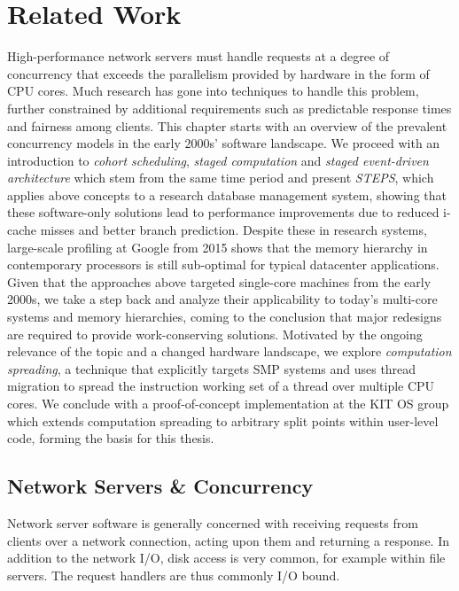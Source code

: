 \documentclass[12pt,a4paper]{book}
\begin{document}
\chapter{Related Work}\label{ch:relwork}
High-performance network servers must handle requests at a degree of concurrency that exceeds the parallelism provided by hardware in the form of CPU cores.
Much research has gone into techniques to handle this problem, further constrained by additional requirements such as predictable response times and fairness among clients.
This chapter starts with an overview of the prevalent concurrency models in the early 2000s' software landscape.
We proceed with an introduction to \emph{cohort scheduling}, \emph{staged computation} and \emph{staged event-driven architecture} which stem from the same time period
and present \emph{STEPS}, which applies above concepts to a research database management system, showing that these software-only solutions lead to performance improvements due to reduced i-cache misses and better branch prediction.
Despite these in research systems, large-scale profiling at Google from 2015 shows that the memory hierarchy in contemporary processors is still sub-optimal for typical datacenter applications.
Given that the approaches above targeted single-core machines from the early 2000s, we take a step back and analyze their applicability to today's multi-core systems and memory hierarchies,
coming to the conclusion that major redesigns are required to provide work-conserving solutions.
Motivated by the ongoing relevance of the topic and a changed hardware landscape, we explore \emph{computation spreading}, a technique that explicitly targets SMP systems and uses thread migration to spread the instruction working set of a thread over multiple CPU cores.
We conclude with a proof-of-concept implementation at the KIT OS group which extends computation spreading to arbitrary split points within user-level code, forming the basis for this thesis.

\section{Network Servers \& Concurrency}\label{ch:relwork:concmod}
Network server software is generally concerned with receiving requests from clients over a network connection, acting upon them and returning a response.
In addition to the network I/O, disk access is very common, for example within file servers.
The request handlers are thus commonly I/O bound.~\cite{seda}
\end{document}
